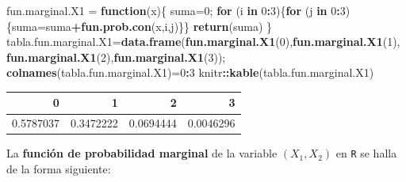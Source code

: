 \documentclass[]{book}
\newenvironment{Shaded}{\begin{snugshade}}{\end{snugshade}}
\newcommand{\ControlFlowTok}[1]{\textcolor[rgb]{0.13,0.29,0.53}{\textbf{#1}}}
\newcommand{\DecValTok}[1]{\textcolor[rgb]{0.00,0.00,0.81}{#1}}
\newcommand{\KeywordTok}[1]{\textcolor[rgb]{0.13,0.29,0.53}{\textbf{#1}}}
\newcommand{\NormalTok}[1]{#1}
\newcommand{\OperatorTok}[1]{\textcolor[rgb]{0.81,0.36,0.00}{\textbf{#1}}}
\newcommand{\StringTok}[1]{\textcolor[rgb]{0.31,0.60,0.02}{#1}}
\begin{document}
\begin{Shaded}
\begin{Highlighting}[]
\NormalTok{fun.marginal.X1 =}\StringTok{ }\ControlFlowTok{function}\NormalTok{(x)\{}
\NormalTok{  suma=}\DecValTok{0}\NormalTok{;}
  \ControlFlowTok{for}\NormalTok{ (i }\ControlFlowTok{in} \DecValTok{0}\OperatorTok{:}\DecValTok{3}\NormalTok{)\{}\ControlFlowTok{for}\NormalTok{ (j }\ControlFlowTok{in} \DecValTok{0}\OperatorTok{:}\DecValTok{3}\NormalTok{)\{suma=suma}\OperatorTok{+}\KeywordTok{fun.prob.con}\NormalTok{(x,i,j)\}\}}
  \KeywordTok{return}\NormalTok{(suma)}
\NormalTok{\}}
\NormalTok{tabla.fun.marginal.X1=}\KeywordTok{data.frame}\NormalTok{(}\KeywordTok{fun.marginal.X1}\NormalTok{(}\DecValTok{0}\NormalTok{),}\KeywordTok{fun.marginal.X1}\NormalTok{(}\DecValTok{1}\NormalTok{),}
                            \KeywordTok{fun.marginal.X1}\NormalTok{(}\DecValTok{2}\NormalTok{),}\KeywordTok{fun.marginal.X1}\NormalTok{(}\DecValTok{3}\NormalTok{));}
\KeywordTok{colnames}\NormalTok{(tabla.fun.marginal.X1)=}\DecValTok{0}\OperatorTok{:}\DecValTok{3}
\NormalTok{knitr}\OperatorTok{::}\KeywordTok{kable}\NormalTok{(tabla.fun.marginal.X1)}
\end{Highlighting}
\end{Shaded}

\begin{tabular}{r|r|r|r}
\hline
0 & 1 & 2 & 3\\
\hline
0.5787037 & 0.3472222 & 0.0694444 & 0.0046296\\
\hline
\end{tabular}

La \textbf{función de probabilidad marginal} de la variable \((X_1,X_2)\) en \texttt{R} se halla de la forma siguiente:
\end{document}
